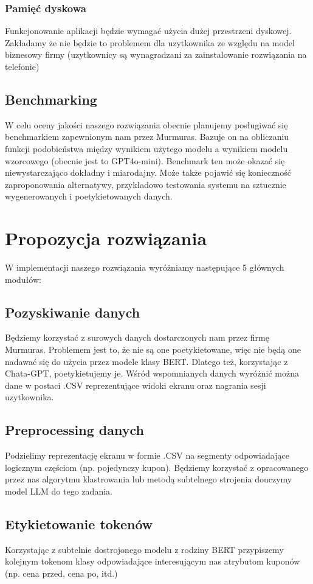\documentclass[12pt]{article}
\begin{document}
\subsubsection*{Pamięć dyskowa}
Funkcjonowanie aplikacji będzie wymagać użycia dużej przestrzeni dyskowej. Zakładamy że nie będzie to problemem dla uzytkownika ze względu na model biznesowy firmy (uzytkownicy są wynagradzani za zainstalowanie rozwiązania na telefonie)
\subsection*{Benchmarking}
W celu oceny jakości naszego rozwiązania obecnie planujemy posługiwać się benchmarkiem zapewnionym nam przez Murmuras.
Bazuje on na obliczaniu funkcji podobieństwa między wynikiem użytego modelu a wynikiem modelu wzorcowego (obecnie jest to GPT4o-mini).
Benchmark ten może okazać się niewystarczająco dokładny i miarodajny. Może także pojawić się konieczność zaproponowania alternatywy, przykładowo testowania systemu na sztucznie wygenerowanych i poetykietowanych danych.
\section*{Propozycja rozwiązania}
W implementacji naszego rozwiązania wyróżniamy następujące 5 głównych modułów:
\subsection*{Pozyskiwanie danych}
Będziemy korzystać z surowych danych dostarczonych nam przez firmę Murmuras. Problemem jest to, że nie są one poetykietowane, więc nie będą one nadawać się do użycia przez modele klasy BERT. Dlatego też, korzystając z Chata-GPT, poetykietujemy je. Wśród wspomnianych danych wyróżnić można dane w postaci .CSV reprezentujące widoki ekranu oraz nagrania sesji uzytkownika.
\subsection*{Preprocessing danych}
Podzielimy reprezentację ekranu w formie .CSV na segmenty odpowiadające logicznym częściom (np. pojedynczy kupon). Będziemy korzystać z opracowanego przez nas algorytmu klastrowania lub metodą subtelnego strojenia douczymy model LLM do tego zadania.
\subsection*{Etykietowanie tokenów}
Korzystając z subtelnie dostrojonego modelu z rodziny BERT \cite{devlin2019bertpretrainingdeepbidirectional} przypiszemy kolejnym tokenom klasy odpowiadające interesującym nas atrybutom kuponów (np. cena przed, cena po, itd.)
\end{document}
